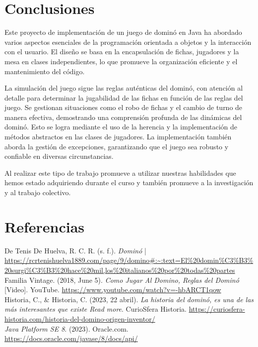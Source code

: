 \documentclass[12pt]{article}
\begin{document}
  \section{Conclusiones}
  Este proyecto de implementación de un juego de dominó en Java ha abordado varios aspectos esenciales de la programación orientada a objetos y la interacción con el usuario. El diseño se basa en la encapsulación de fichas, jugadores y la mesa en clases independientes, lo que promueve la organización eficiente y el mantenimiento del código.
  
  La simulación del juego sigue las reglas auténticas del dominó, con atención al detalle para determinar la jugabilidad de las fichas en función de las reglas del juego. Se gestionan situaciones como el robo de fichas y el cambio de turno de manera efectiva, demostrando una comprensión profunda de las dinámicas del dominó. Esto se logra mediante el uso de la herencia y la implementación de métodos abstractos en las clases de jugadores. La implementación también aborda la gestión de excepciones, garantizando que el juego sea robusto y confiable en diversas circunstancias.

  Al realizar este tipo de trabajo promueve a utilizar nuestras habilidades que hemos estado adquiriendo durante el curso y también promueve a la investigación y al trabajo colectivo.

  \section{Referencias}
  De Tenis De Huelva, R. C. R. (s. f.). \textit{Dominó} | \url{https://rcrtenishuelva1889.com/page/9/domino#:~:text=El%20domin%C3%B3%20surgi%C3%B3%20hace%20mil,los%20italianos%20por%20todas%20partes} \\

  Familia Vintage. (2018, June 5). \textit{Como Jugar Al Domino, Reglas del Dominó} [Video]. YouTube. \url{https://www.youtube.com/watch?v=-hbARCT1qow} \\

  Historia, C., $\&$ Historia, C. (2023, 22 abril). \textit{La historia del dominó, es una de las más interesantes que existe Read more}. CurioSfera Historia. \url{https://curiosfera-historia.com/historia-del-domino-origen-inventor/} \\

  \textit{Java Platform SE 8}. (2023). Oracle.com. \url{https://docs.oracle.com/javase/8/docs/api/} \\
\end{document}
